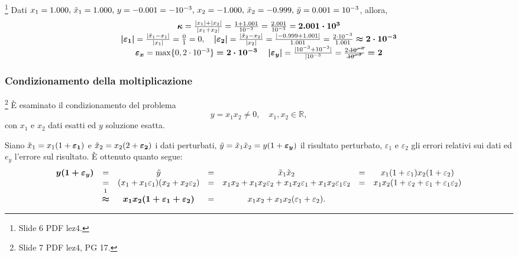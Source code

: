 \begin{example}
	\footnote{Slide 6 PDF lez4.} Dati $x_1=1.000,\, \Tilde{x}_1=1.000,\, y=-0.001=-10^{-3},\, x_2=-1.000,\,\Tilde{x}_2=-0.999,\, \Tilde{y}=0.001=10^{-3}$, allora,
	\begin{equation*}
		\begin{matrix}
			\boldsymbol\kappa=\frac{|x_1|+|x_2|}{|x_1+x_2|}=\frac{1+1.001}{10^{-3}}=\frac{2.001}{10^{-3}}=\boldsymbol{2.001\cdot 10^3}\\
			\boldsymbol{|\varepsilon_1|}=\frac{|\Tilde{x}_1-x_1|}{|x_1|}=\frac{0}{1}=0,\quad \boldsymbol{|\varepsilon_2|}=\frac{|\Tilde{x}_2-x_2|}{|x_2|}=\frac{|-0.999+1.001|}{1.001}=\frac{2\cdot 10^{-3}}{1.001}\boldsymbol{\approx 2\cdot 10^{-3}}\\
			\boldsymbol{\varepsilon_x}=\max\{0,2\cdot10^{-3}\}\boldsymbol{=2\cdot 10^{-3}}\quad\boldsymbol{|\varepsilon_y|}=\frac{|10^{-3}+10^{-3}|}{|10^{-3}}=\frac{2\cdot \cancel{10^{-3}}}{\cancel{10^{-3}}}\boldsymbol{=2}
		\end{matrix}
	\end{equation*}
\end{example}

\subsubsection{Condizionamento della moltiplicazione}
\footnote{Slide 7 PDF lez4, PG 17.} È esaminato il condizionamento del problema
\begin{equation}\label{eq:problema_condizionamento_moltiplicazione}
	y=x_1x_2\neq 0,\quad x_1,x_2\in\mathbb R,
\end{equation}
con $x_1$ e $x_2$ dati esatti ed $y$ soluzione esatta. 

Siano $\Tilde{x}_1=x_1(1+\boldsymbol{\varepsilon_1})$ e $\Tilde{x}_2=x_2(2+\boldsymbol{\varepsilon_2})$ i dati perturbati, $\Tilde{y}=\Tilde{x}_1\Tilde{x}_2=y(1+\boldsymbol{\varepsilon_y})$ il risultato perturbato, $\varepsilon_1$ e $\varepsilon_2$ gli errori relativi sui dati ed $e_y$ l'errore sul risultato. È ottenuto quanto segue:
\begin{equation*}
	\begin{matrix}
		\boldsymbol{y(1+\varepsilon_y)}&=&\Tilde{y}&=&\Tilde{x}_1\Tilde{x}_2&=&x_1(1+\varepsilon_1)x_2(1+\varepsilon_2)\\
		&=&(x_1+x_1\varepsilon_1)(x_2+x_2\varepsilon_2) &=&x_1x_2+x_1x_2\varepsilon_2+x_1x_2\varepsilon_1+x_1x_2\varepsilon_1\varepsilon_2&=&x_1x_2(1+\varepsilon_2+\varepsilon_1+\varepsilon_1\varepsilon_2)\\
		&\overset{\footnotemark}{\boldsymbol{\approx}}&\boldsymbol{x_1x_2(1+\varepsilon_1+\varepsilon_2)}&=&x_1x_2+x_1x_2(\varepsilon_1+\varepsilon_2).
	\end{matrix}
\end{equation*}


